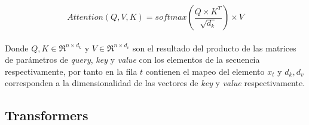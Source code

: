 		\begin{equation}
			Attention(Q, V, K) = softmax(\frac{Q\times K^T}{\sqrt{d_k}})\times V
			\label{dotP-att}
		\end{equation} \\
		Donde $Q, K \in \Re^{n\times d_k} \text{ y } V \in \Re^{n\times d_v} $ son el resultado del producto de las matrices de parámetros de \textit{query}, \textit{key} y \textit{value} con los elementos de la secuencia respectivamente, por tanto en la fila $t$ contienen el mapeo del elemento $x_t$ y  $d_k,d_v$ corresponden a la dimensionalidad de las vectores de \textit{key} y \textit{value} respectivamente.
		
\subsection{Transformers}

